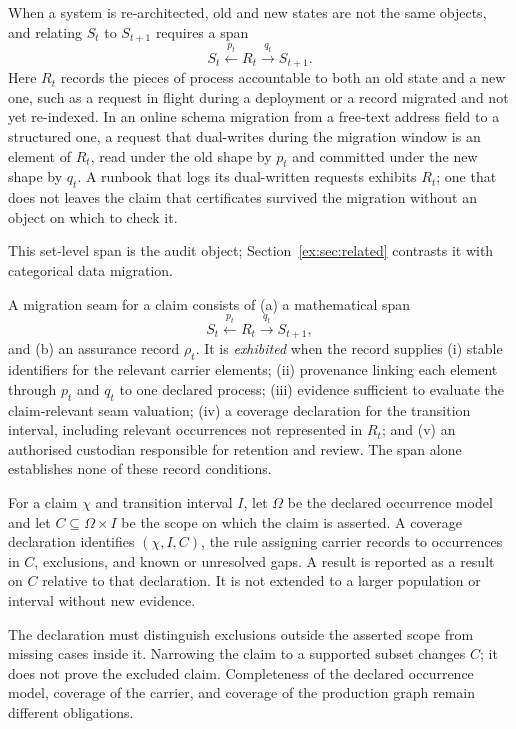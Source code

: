\documentclass[smallextended,envcountsect,envcountsame,natbib]{svjour3}
\begin{document}
When a system is re-architected, old and new states are not the same objects, and relating $S_t$ to $S_{t+1}$ requires a span
\[
S_t \xleftarrow{\;p_t\;} R_t \xrightarrow{\;q_t\;} S_{t+1}.
\]
Here $R_t$ records the pieces of process accountable to both an old state and a new one, such as a request in flight during a deployment or a record migrated and not yet re-indexed. In an online schema migration from a free-text address field to a structured one, a request that dual-writes during the migration window is an element of $R_t$, read under the old shape by $p_t$ and committed under the new shape by $q_t$. A runbook that logs its dual-written requests exhibits $R_t$; one that does not leaves the claim that certificates survived the migration without an object on which to check it.

This set-level span is the audit object; Section~\ref{ex:sec:related} contrasts it with categorical data migration.

\begin{definition}\label{ex:def:exhibited-seam}
A migration seam for a claim consists of (a) a mathematical span
\[
S_t\xleftarrow{p_t}R_t\xrightarrow{q_t}S_{t+1},
\]
and (b) an assurance record $\rho_t$. It is \emph{exhibited} when the record supplies (i) stable identifiers for the relevant carrier elements; (ii) provenance linking each element through $p_t$ and $q_t$ to one declared process; (iii) evidence sufficient to evaluate the claim-relevant seam valuation; (iv) a coverage declaration for the transition interval, including relevant occurrences not represented in $R_t$; and (v) an authorised custodian responsible for retention and review. The span alone establishes none of these record conditions.
\end{definition}

\begin{definition}\label{ex:def:coverage}
For a claim $\chi$ and transition interval $I$, let $\Omega$ be the declared occurrence model and let $C\subseteq\Omega\times I$ be the scope on which the claim is asserted. A coverage declaration identifies $(\chi,I,C)$, the rule assigning carrier records to occurrences in $C$, exclusions, and known or unresolved gaps. A result is reported as a result on $C$ relative to that declaration. It is not extended to a larger population or interval without new evidence.
\end{definition}

The declaration must distinguish exclusions outside the asserted scope from missing cases inside it. Narrowing the claim to a supported subset changes $C$; it does not prove the excluded claim. Completeness of the declared occurrence model, coverage of the carrier, and coverage of the production graph remain different obligations.
\end{document}
